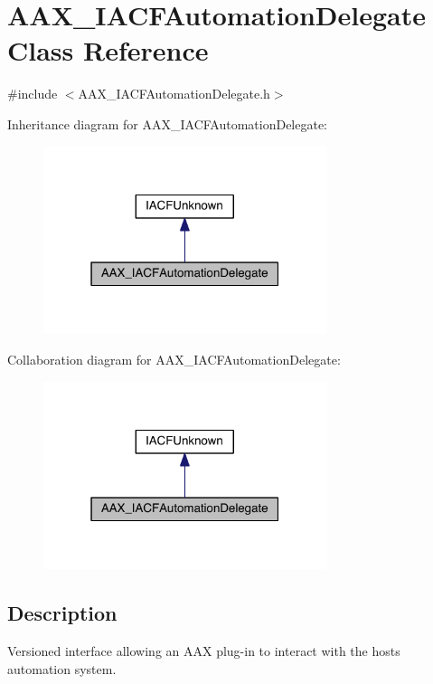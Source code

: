 \hypertarget{a00048}{}\section{A\+A\+X\+\_\+\+I\+A\+C\+F\+Automation\+Delegate Class Reference}
\label{a00048}


{\ttfamily \#include $<$A\+A\+X\+\_\+\+I\+A\+C\+F\+Automation\+Delegate.\+h$>$}



Inheritance diagram for A\+A\+X\+\_\+\+I\+A\+C\+F\+Automation\+Delegate\+:
\nopagebreak
\begin{figure}[H]
\begin{center}
\leavevmode
\includegraphics[width=235pt]{a00487}
\end{center}
\end{figure}


Collaboration diagram for A\+A\+X\+\_\+\+I\+A\+C\+F\+Automation\+Delegate\+:
\nopagebreak
\begin{figure}[H]
\begin{center}
\leavevmode
\includegraphics[width=235pt]{a00488}
\end{center}
\end{figure}


\subsection{Description}
Versioned interface allowing an A\+A\+X plug-\/in to interact with the host\textquotesingle{}s automation system. 


